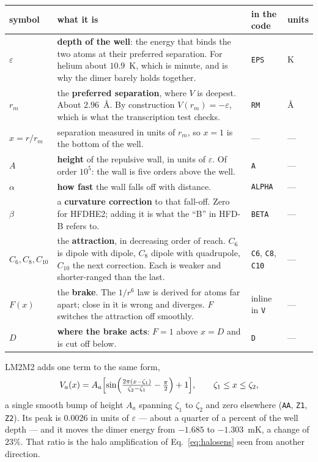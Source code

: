 \documentclass[11pt,a4paper]{article}
\begin{document}
\begin{center}
\small
\begin{tabular}{@{}l@{\hspace{4pt}}p{8.0cm}@{\hspace{4pt}}l@{\hspace{4pt}}l@{}}
\toprule
symbol & what it is & in the code & units \\
\midrule
$\varepsilon$ & \textbf{depth of the well}: the energy that binds the two atoms
      at their preferred separation. For helium about $10.9$~K, which is
      minute, and is why the dimer barely holds together.
      & \texttt{EPS} & K \\
$r_m$ & the \textbf{preferred separation}, where $V$ is deepest. About
      $2.96$~\AA. By construction $V(r_m)=-\varepsilon$, which is what the
      transcription test checks.
      & \texttt{RM} & \AA \\
$x=r/r_m$ & separation measured in units of $r_m$, so $x=1$ is the bottom of
      the well. & --- & --- \\
$A$ & \textbf{height} of the repulsive wall, in units of $\varepsilon$. Of order
      $10^5$: the wall is five orders above the well. & \texttt{A} & --- \\
$\alpha$ & \textbf{how fast} the wall falls off with distance. & \texttt{ALPHA} & --- \\
$\beta$ & a \textbf{curvature correction} to that fall-off. Zero for HFDHE2;
      adding it is what the ``B'' in HFD-B refers to. & \texttt{BETA} & --- \\
$C_6,C_8,C_{10}$ & the \textbf{attraction}, in decreasing order of reach.
      $C_6$ is dipole with dipole, $C_8$ dipole with quadrupole, $C_{10}$ the
      next correction. Each is weaker and shorter-ranged than the last.
      & \texttt{C6}, \texttt{C8}, \texttt{C10} & --- \\
$F(x)$ & the \textbf{brake}. The $1/r^6$ law is derived for atoms far apart;
      close in it is wrong and diverges. $F$ switches the attraction off
      smoothly. & inline in \texttt{V} & --- \\
$D$ & \textbf{where the brake acts}: $F=1$ above $x=D$ and is cut off below.
      & \texttt{D} & --- \\
\bottomrule
\end{tabular}
\end{center}

\noindent
LM2M2 adds one term to the same form,
\[
  V_a(x) = A_a\Bigl[\sin\Bigl(\tfrac{2\pi(x-\zeta_1)}{\zeta_2-\zeta_1}-\tfrac{\pi}{2}\Bigr)+1\Bigr],
  \qquad \zeta_1\le x\le\zeta_2,
\]
a single smooth bump of height $A_a$ spanning $\zeta_1$ to $\zeta_2$ and zero
elsewhere (\texttt{AA}, \texttt{Z1}, \texttt{Z2}). Its peak is $0.0026$ in units
of $\varepsilon$ --- about a quarter of a percent of the well depth --- and it
moves the dimer energy from $-1.685$ to $-1.303$~mK, a change of $23\%$. That
ratio is the halo amplification of Eq.~\eqref{eq:halosens} seen from another
direction.
\end{document}
